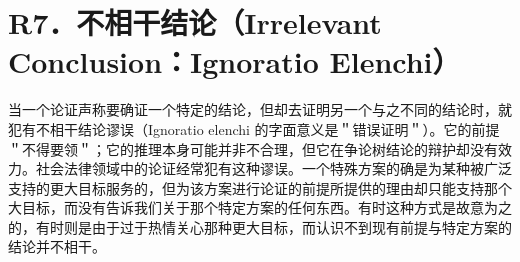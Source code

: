 \section*{R7．不相干结论（Irrelevant Conclusion：Ignoratio Elenchi）}
当一个论证声称要确证一个特定的结论，但却去证明另一个与之不同的结论时，就犯有不相干结论谬误（Ignoratio elenchi 的字面意义是＂错误证明＂）。它的前提＂不得要领＂；它的推理本身可能并非不合理，但它在争论树结论的辩护却没有效力。社会法律领域中的论证经常犯有这种谬误。一个特殊方案的确是为某种被广泛支持的更大目标服务的，但为该方案进行论证的前提所提供的理由却只能支持那个大目标，而没有告诉我们关于那个特定方案的任何东西。有时这种方式是故意为之的，有时则是由于过于热情关心那种更大目标，而认识不到现有前提与特定方案的结论并不相干。 